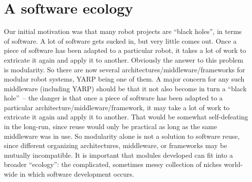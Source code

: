 
\section{A software ecology}



%
Our initial motivation was that
many robot projects are ``black holes'', in terms of software.  A lot
of software gets sucked in, but very little comes out.  Once a piece
of software has been adapted to a particular robot, it takes a lot
of work to extricate it again and apply it to another.
%
Obviously the answer to this problem is modularity.  So there are 
now several architectures/middleware/frameworks for modular robot systems,
YARP being one of them.
A major concern for any such middleware (including YARP) should be that it 
not also become
in turn a ``black hole''~-- the
danger is that once a piece of software has been adapted
to a particular architecture/middleware/framework, it may take a lot of work to extricate it
again and apply it to another.  That would be somewhat self-defeating
in the long-run, since reuse would only be practical as long as the
same middleware was in use.
%
So modularity alone is not a solution to software reuse, since 
different organizing architectures, middleware, or frameworks may be mutually
incompatible.  It is important that modules developed can fit
into a broader ``ecology'': the  complicated, sometimes messy
collection of niches world-wide in which software development occurs.






